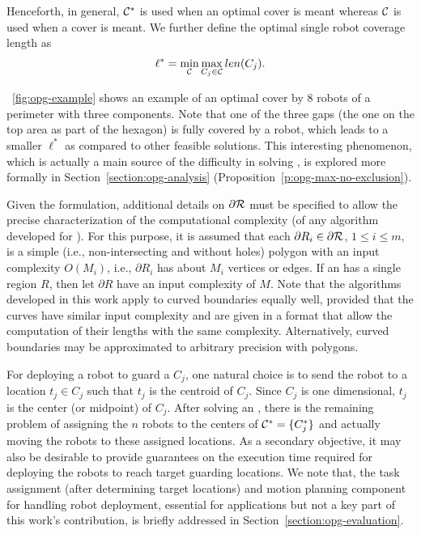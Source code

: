 Henceforth, in general, $\mathcal C^*$ is used when an optimal cover is meant 
whereas $\mathcal C$ is used when a cover is meant. We further define the optimal 
single robot coverage length as 
\begin{align}\label{eq:opg-l-star}
\vspace*{-1mm}
\ell^* = \min_{\C} \max_{C_j \in \C} len(C_j).
\vspace*{-1mm}
\end{align}

~\ref{fig:opg-example} shows an example of an optimal cover by $8$ robots 
of a perimeter with three components. Note that one of the three gaps 
(the one on the top area as part of the hexagon) is fully covered 
by a robot, which leads to a smaller $\ell^*$ as compared to other 
feasible solutions. This interesting phenomenon, which is 
actually a main source of the difficulty in solving \opg, is explored 
more formally in Section~\ref{section:opg-analysis} 
(Proposition~\ref{p:opg-max-no-exclusion}).

Given the \opg formulation, additional details on $\partial \mathcal R$ must 
be specified to allow the precise characterization of the computational 
complexity (of any algorithm developed for \opg). For this purpose, it 
is assumed that each $\partial R_i \in \partial \mathcal R$, $1 \le i \le m$, 
is a simple (i.e., non-intersecting and without holes) polygon with an 
input complexity $O(M_i)$, i.e., $\partial R_i$ has about $M_i$ vertices 
or edges. If an \opg has a single region $R$, then let $\partial R$ have 
an input complexity of $M$. Note that the algorithms developed in this 
work apply to curved boundaries equally well, provided that the curves 
have similar input complexity and are given in a format that allow the 
computation of their lengths with the same complexity. 
Alternatively, curved boundaries may be approximated to arbitrary 
precision with polygons. 


For deploying a robot to guard a $C_j$, one natural choice is to send the 
robot to a location $t_j \in C_j$ such that $t_j$ is the centroid of $C_j$. 
Since $C_j$ is one dimensional, $t_j$ is the center (or midpoint) of $C_j$. 
After solving an \opg, there is the remaining problem of assigning the $n$ 
robots to the centers of $\mathcal C^* = \{C_j^*\}$ and actually moving the robots 
to these assigned locations. As a secondary objective, it may also be 
desirable to provide guarantees on the execution time required for 
deploying the robots to reach target guarding locations. We note that, 
the task assignment (after determining target locations) and motion 
planning component for handling robot deployment, essential for applications 
but not a key part of this work's contribution, is briefly addressed in 
Section~\ref{section:opg-evaluation}. 

